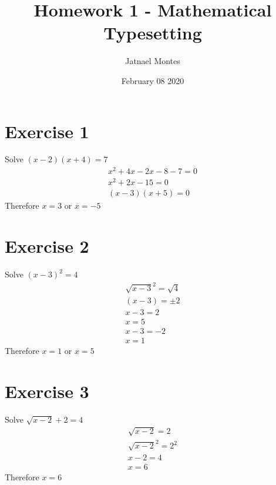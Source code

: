 \documentclass{article}
\title{Homework 1 - Mathematical Typesetting}
\author{Jatnael Montes }
\date{February 08 2020}
\begin{document}
\maketitle

\section*{Exercise 1}
Solve $(x-2)(x+4) = 7$
\begin{align*}
x^2 + 4x -2x - 8 - 7 = 0\\
x^2 +2x -15 = 0\\
(x-3)(x+5) = 0
\end{align*}
Therefore $x=3$ or $x=-5$

\section*{Exercise 2}
Solve $(x-3)^2 = 4$
\begin{align*}
\sqrt{x-3}^2 = \sqrt{4}\\
(x-3) = \pm2\\
x-3 = 2 \\
x = 5 \\
x-3 = -2 \\
x = 1
\end{align*}
Therefore $x=1$ or $x=5$

\section*{Exercise 3}
Solve $\sqrt{x-2} + 2 = 4$
\begin{align*}
\sqrt{x-2} = 2 \\
\sqrt{x-2}^2 = 2^2 \\
x-2 = 4 \\
x = 6
\end{align*}
Therefore $x=6$
\end{document}
